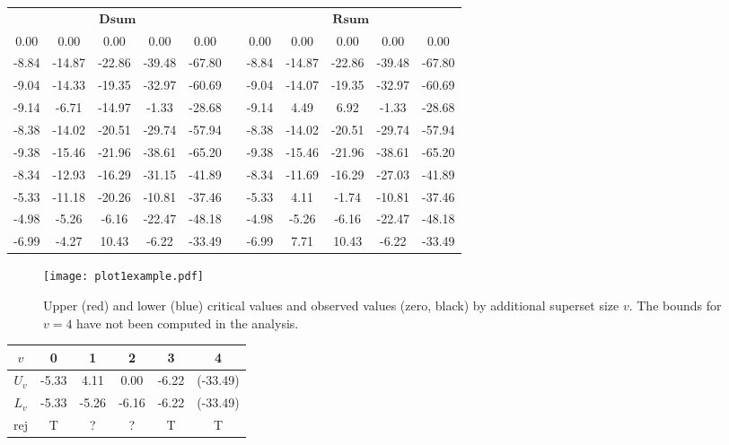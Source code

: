 \documentclass[11pt,a4paper,openright,twoside]{article}
\begin{document}
\begin{table}[h!]
\centering
\begin{tabular}{ccccccccccc}
\multicolumn{5}{c}{$\mathbf{Dsum}$} & & \multicolumn{5}{c}{$\mathbf{Rsum}$}\\
\cline{1-5} \cline{7-11}
0.00 & 0.00 & 0.00 & 0.00 & 0.00 &  & 0.00 & 0.00 & 0.00 & 0.00 & 0.00\\
-8.84 & -14.87 &-22.86 &-39.48 & -67.80 &  & -8.84 & -14.87 & -22.86 & -39.48 & -67.80\\
-9.04 & -14.33 & -19.35 & -32.97 & -60.69 &  & -9.04 & -14.07 & -19.35 & -32.97 & -60.69\\
-9.14 & -6.71 & -14.97 & -1.33 & -28.68 &  & -9.14 & 4.49 & 6.92 & -1.33 & -28.68\\
-8.38 & -14.02 & -20.51 & -29.74 & -57.94 &  & -8.38 & -14.02 & -20.51 & -29.74 & -57.94\\
-9.38 & -15.46 & -21.96 & -38.61 & -65.20 &  & -9.38 & -15.46 & -21.96 & -38.61 & -65.20\\
-8.34 & -12.93 & -16.29 & -31.15 & -41.89 &  & -8.34 & -11.69 & -16.29 & -27.03 & -41.89\\
-5.33 & -11.18 & -20.26 & -10.81 & -37.46 &  & -5.33 & 4.11 & -1.74 & -10.81 & -37.46\\
-4.98 & -5.26 & -6.16 & -22.47 & -48.18 &  & -4.98 & -5.26 & -6.16 & -22.47 & -48.18\\
-6.99 & -4.27 & 10.43 & -6.22 & -33.49 &  & -6.99 & 7.71 & 10.43 & -6.22 &-33.49
\end{tabular}
\end{table}

\vspace{2mm}

\begin{figure}[h!]
\centering
\texttt{[image: plot1example.pdf]}
\caption{Upper (red) and lower (blue) critical values and observed values (zero, black) by additional superset size $v$. The bounds for $v=4$ have not been computed in the analysis.}
\end{figure}


\begin{table}[h!]
\centering
\begin{tabular}{cccccc}
\toprule
$v$ & 0 & 1 & 2 & 3 & 4\\
\midrule
$U_v$ & -5.33 & 4.11 & 0.00 & -6.22 & (-33.49)\\
$L_v$ & -5.33 & -5.26 & -6.16 & -6.22 & (-33.49)\\
\midrule
rej & T & ? & ? & T & T\\
\bottomrule
\end{tabular}
\end{table}
\end{document}
